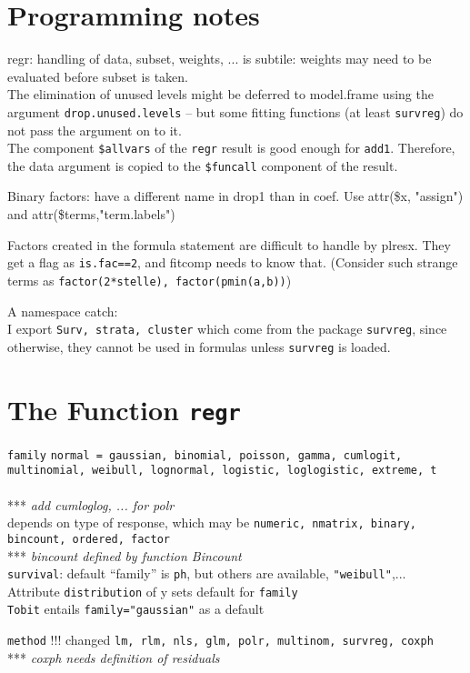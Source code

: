 \documentclass[11pt]{article}
\def\note#1{\\ *** \emph{#1}\\}
\def\T{\texttt}
\begin{document}
\section{Programming notes}
\Itm
regr: handling of data, subset, weights, ...
is subtile: weights may need to be evaluated before subset is taken.\\
The elimination of unused levels might be deferred to model.frame using the
argument \T{drop.unused.levels} -- 
but some fitting functions (at least \T{survreg}) do not pass the argument
on to it.\\
The component \T{\$allvars} of the \T{regr} result is good enough for 
\T{add1}. Therefore, the data argument is copied to the \T{\$funcall}
component of the result.

\Itm %
Binary factors: have a different name in drop1 than in coef.
\Arrow Use attr(\$x, "assign") and attr(\$terms,"term.labels")

\Itm
Factors created in the formula statement are difficult to handle
by plresx. They get a flag as \T{is.fac==2}, and fitcomp needs to know
that.
(Consider such strange terms as \T{factor(2*stelle), factor(pmin(a,b))})

\Itm
A namespace catch:\\
I export \T{Surv, strata, cluster} which come from the package
\T{survreg}, since otherwise, they cannot be used in formulas
unless \T{survreg} is loaded.

\section{The Function \T{regr}}
\Itm
\T{family} %
\T{normal = gaussian, binomial, poisson, gamma, cumlogit, multinomial,
weibull, lognormal, logistic, loglogistic, extreme, t}\\
\note{add cumloglog, ... for polr}
depends on type of response, which may be
\T{numeric, nmatrix, binary, bincount, ordered, factor}
\note{bincount defined by function Bincount}
\T{survival}: default ``family'' is \T{ph}, but others are available,
\T{"weibull"},...\\
Attribute \T{distribution} of y sets default for \T{family}\\
\T{Tobit} entails \T{family="gaussian"} as a default

\Itm
\T{method} !!! changed
\T{lm, rlm, nls, glm, polr, multinom, survreg, coxph}
\note{coxph needs definition of residuals}
\end{document}
